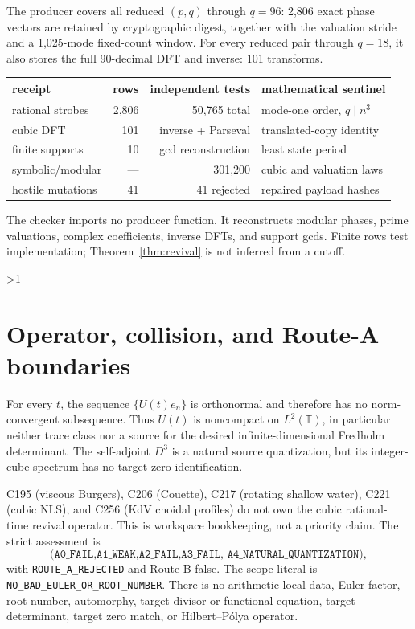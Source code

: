\documentclass[10pt]{article}
\newcommand{\T}{\mathbb T}
\begin{document}
The producer covers all reduced $(p,q)$ through $q=96$: 2,806 exact phase
vectors are retained by cryptographic digest, together with the valuation
stride and a 1,025-mode fixed-count window.  For every reduced pair through
$q=18$, it also stores the full 90-decimal DFT and inverse: 101 transforms.
\begin{center}
\small
\begin{tabular}{lrrl}
\toprule
receipt & rows & independent tests & mathematical sentinel\\
\midrule
rational strobes & 2,806 & 50,765 total & mode-one order, $q\mid n^3$\\
cubic DFT & 101 & inverse + Parseval & translated-copy identity\\
finite supports & 10 & gcd reconstruction & least state period\\
symbolic/modular & --- & 301,200 & cubic and valuation laws\\
hostile mutations & 41 & 41 rejected & repaired payload hashes\\
\bottomrule
\end{tabular}
\end{center}
The checker imports no producer function.  It reconstructs modular phases,
prime valuations, complex coefficients, inverse DFTs, and support gcds.
Finite rows test implementation; Theorem~\ref{thm:revival} is not inferred
from a cutoff.
\fi

\ifnum\CRevisionRound>1
\section{Operator, collision, and Route-A boundaries}
For every $t$, the sequence $\{U(t)e_n\}$ is orthonormal and therefore has
no norm-convergent subsequence.  Thus $U(t)$ is noncompact on
$L^2(\T)$, in particular neither trace class nor a source for the desired
infinite-dimensional Fredholm determinant.  The self-adjoint $D^3$ is a
natural source quantization, but its integer-cube spectrum has no target-zero
identification.

C195 (viscous Burgers), C206 (Couette), C217 (rotating shallow water), C221
(cubic NLS), and C256 (KdV cnoidal profiles) do not own the cubic rational-
time revival operator.  This is workspace bookkeeping, not a priority claim.
The strict assessment is
\[
\texttt{(A0\_FAIL,A1\_WEAK,A2\_FAIL,A3\_FAIL,
A4\_NATURAL\_QUANTIZATION)},
\]
with \texttt{ROUTE\_A\_REJECTED} and Route B false.  The scope literal is
\texttt{NO\_BAD\_EULER\_OR\_ROOT\_NUMBER}.  There is no arithmetic local
data, Euler factor, root number, automorphy, target divisor or functional
equation, target determinant, target zero match, or Hilbert--P\'olya operator.
\fi
\end{document}
